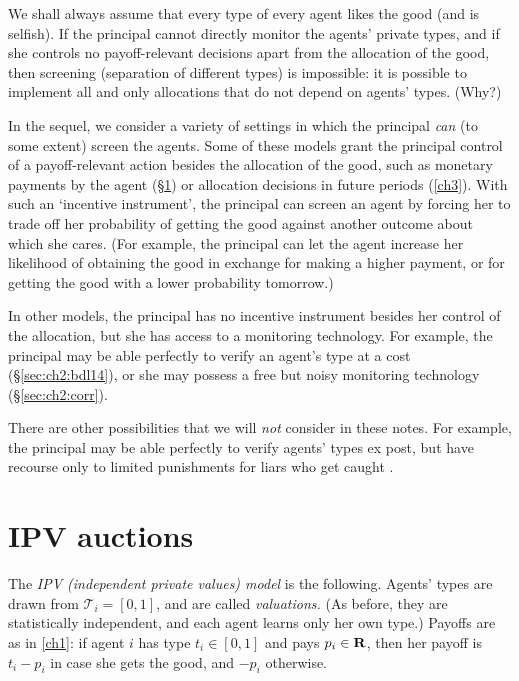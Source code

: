 We shall always assume that every type of every agent likes the good (and is selfish).
If the principal cannot directly monitor the agents' private types,
and if she controls no payoff-relevant decisions apart from the allocation of the good, then screening (separation of different types) is impossible:
it is possible to implement all and only allocations that do not depend on agents' types. (Why?)

In the sequel, we consider a variety of settings in which the principal \emph{can} (to some extent) screen the agents.
Some of these models grant the principal control of a payoff-relevant action besides the allocation of the good,
such as monetary payments by the agent (§\ref{sec:ch2:ipv})
or allocation decisions in future periods (\cref{ch3}).
With such an `incentive instrument', the principal can screen an agent by forcing her to trade off her probability of getting the good against another outcome about which she cares.
(For example, the principal can let the agent increase her likelihood of obtaining the good in exchange for making a higher payment, or for getting the good with a lower probability tomorrow.)

In other models, the principal has no incentive instrument besides her control of the allocation, but she has access to a monitoring technology.
For example, the principal may be able perfectly to verify an agent's type at a cost (§\ref{sec:ch2:bdl14}), or she may possess a free but noisy monitoring technology (§\ref{sec:ch2:corr}).

There are other possibilities that we will \emph{not} consider in these notes.
For example, the principal may be able perfectly to verify agents' types ex post, but have recourse only to limited punishments for liars who get caught \parencite[see][]{MylovanovZapechelnyuk2017}.



\section{IPV auctions}
\label{sec:ch2:ipv}

The \emph{IPV (independent private values) model} is the following.
Agents' types are drawn from $\mathcal{T}_i = [0,1]$, and are called \emph{valuations.}
(As before, they are statistically independent, and each agent learns only her own type.)
Payoffs are as in \cref{ch1}: if agent $i$ has type $t_i \in [0,1]$ and pays $p_i \in \mathbf{R}$, then her payoff is $t_i - p_i$ in case she gets the good, and $-p_i$ otherwise.

